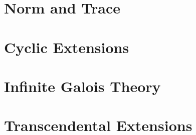 \documentclass{report}
\begin{document}
\chapter{Norm and Trace}


\chapter{Cyclic Extensions}


\chapter{Infinite Galois Theory}


\chapter{Transcendental Extensions}




\end{document}
